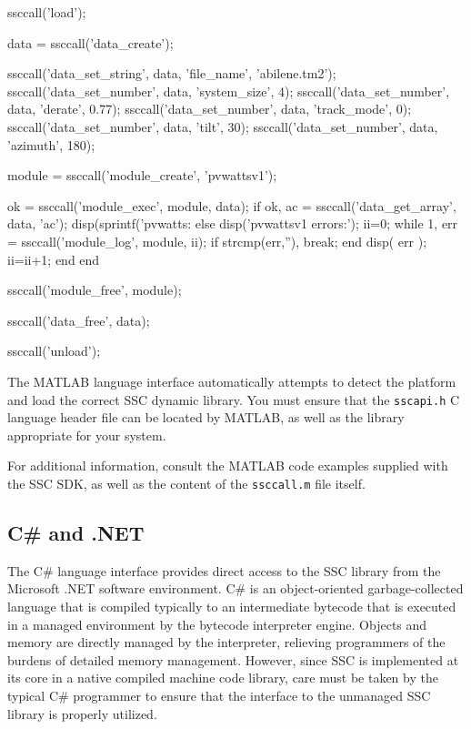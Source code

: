 \documentclass{article}
\begin{document}
\begin{verbatimtab}[4]
ssccall('load');

data = ssccall('data_create');

ssccall('data_set_string', data, 'file_name', 'abilene.tm2');
ssccall('data_set_number', data, 'system_size', 4);
ssccall('data_set_number', data, 'derate', 0.77);
ssccall('data_set_number', data, 'track_mode', 0);
ssccall('data_set_number', data, 'tilt', 30);
ssccall('data_set_number', data, 'azimuth', 180);

module = ssccall('module_create', 'pvwattsv1');

ok = ssccall('module_exec', module, data);
if ok,
    ac = ssccall('data_get_array', data, 'ac');
    disp(sprintf('pvwatts: %
else
    disp('pvwattsv1 errors:');
    ii=0;
    while 1,
        err = ssccall('module_log', module, ii);
        if strcmp(err,''),
            break;
        end
        disp( err );
        ii=ii+1;
    end
end

ssccall('module_free', module);

ssccall('data_free', data);

ssccall('unload');
\end{verbatimtab}

The MATLAB language interface automatically attempts to detect the platform and load the correct SSC dynamic library.  You must ensure that the \texttt{sscapi.h} C language header file can be located by MATLAB, as well as the library appropriate for your system.  

For additional information, consult the MATLAB code examples supplied with the SSC SDK, as well as the content of the \texttt{ssccall.m} file itself.

\subsection{C\# and .NET}

The C\# language interface provides direct access to the SSC library from the Microsoft .NET software environment.  C\# is an object-oriented garbage-collected language that is compiled typically to an intermediate bytecode that is executed in a managed environment by the bytecode interpreter engine.  Objects and memory are directly managed by the interpreter, relieving programmers of the burdens of detailed memory management.  However, since SSC is implemented at its core in a native compiled machine code library, care must be taken by the typical C\# programmer to ensure that the interface to the unmanaged SSC library is properly utilized.
\end{document}

